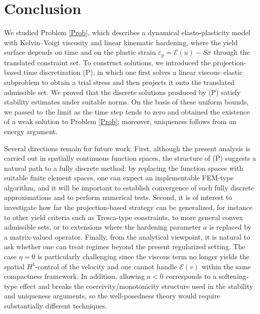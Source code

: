 \documentclass[11pt, a4paper]{article}
\newcommand{\E}{{\mathcal{E}}}
\begin{document}
\section{Conclusion}

We studied Problem \ref{Prob}, which describes a dynamical elasto-plasticity model with Kelvin--Voigt viscosity and linear kinematic hardening, where the yield surface depends on time and on the plastic strain $\varepsilon_p=\E(u)-S\sigma$ through the translated constraint set.
To construct solutions, we introduced the projection-based time discretization (P), in which one first solves a linear viscous--elastic subproblem to obtain a trial stress and then projects it onto the translated admissible set.
We proved that the discrete solutions produced by (P) satisfy stability estimates under suitable norms. On the basis of these uniform bounds, we passed to the limit as the time step tends to zero and obtained the existence of a weak solution to Problem \ref{Prob}; moreover, uniqueness follows from an energy argument.

Several directions remain for future work. First, although the present analysis is carried out in spatially continuous function spaces, the structure of (P) suggests a natural path to a fully discrete method: by replacing the function spaces with suitable finite element spaces, one can expect an implementable FEM-type algorithm, and it will be important to establish convergence of such fully discrete approximations and to perform numerical tests.
Second, it is of interest to investigate how far the projection-based strategy can be generalized, for instance to other yield criteria such as Tresca-type constraints, to more general convex admissible sets, or to extensions where the hardening parameter $a$ is replaced by a matrix-valued operator.
Finally, from the analytical viewpoint, it is natural to ask whether one can treat regimes beyond the present regularized setting. The case $\eta=0$ is particularly challenging since the viscous term no longer yields the spatial $H^1$-control of the velocity and one cannot handle $\E(v)$ within the same compactness framework. In addition, allowing $a<0$ corresponds to a softening-type effect \cite{Gudoshnikov25} and breaks the coercivity/monotonicity structure used in the stability and uniqueness arguments, so the well-posedness theory would require substantially different techniques.



\end{document}
